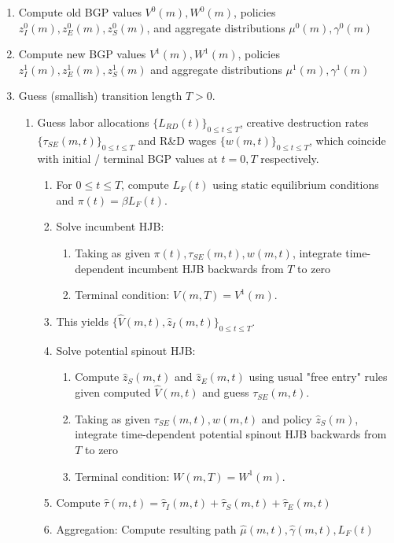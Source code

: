 \documentclass[10pt,english]{article}
\theoremstyle{remark}
\begin{document}
\begin{enumerate}
	\item Compute old BGP values $V^0(m),W^0(m)$, policies $z_I^0(m),z_E^0(m),z_S^0(m)$, and aggregate distributions $\mu^0(m),\gamma^0(m)$
	\item Compute new BGP values $V^1(m),W^1(m)$, policies $z_I^1(m),z_E^1(m),z_S^1(m)$ and aggregate distributions $\mu^1(m),\gamma^1(m)$
	\item Guess (smallish) transition length $T > 0$.
	\begin{enumerate}
		\item Guess labor allocations $\Big\{L_{RD}(t)\Big\}_{0 \le t \le T}$, creative destruction rates $\Big\{\tau_{SE}(m,t)\Big\}_{0 \le t \le T}$ and R\&D wages $\Big\{w(m,t)\Big\}_{0 \le t \le T}$, which coincide with initial / terminal BGP values at $t = 0,T$ respectively. 
		\begin{enumerate}
			\item For $0 \le t \le T$, compute $L_F(t)$ using static equilibrium conditions and $\pi(t) = \beta L_F(t)$. 
			\item Solve incumbent HJB:
			\begin{enumerate}
				\item Taking as given $\pi(t),\tau_{SE}(m,t),w(m,t)$, integrate time-dependent incumbent HJB backwards from $T$ to zero
				\item Terminal condition: $V(m,T) = V^1(m)$.
			\end{enumerate}
			\item This yields $\Big\{\hat{V}(m,t),\hat{z}_I(m,t) \Big\}_{0 \le t \le T}$. 
			\item Solve potential spinout HJB:
			\begin{enumerate}
				\item Compute $\hat{z}_S(m,t)$ and $\hat{z}_E(m,t)$ using usual "free entry" rules given computed $\hat{V}(m,t)$ and guess $\tau_{SE}(m,t)$. 
				\item Taking as given $\tau_{SE}(m,t),w(m,t)$ and policy $\hat{z}_S(m)$, integrate time-dependent potential spinout HJB backwards from $T$ to zero
				\item Terminal condition: $W(m,T) = W^1(m)$.
			\end{enumerate}
			\item Compute $\hat{\tau}(m,t) = \hat{\tau}_I(m,t) + \hat{\tau}_S(m,t) + \hat{\tau}_E(m,t)$
			\item Aggregation: Compute resulting path $\hat{\mu}(m,t),\hat{\gamma}(m,t),L_F(t)$
			\begin{enumerate}

\end{enumerate}
\end{enumerate}
\end{enumerate}
\end{enumerate}
\end{document}
